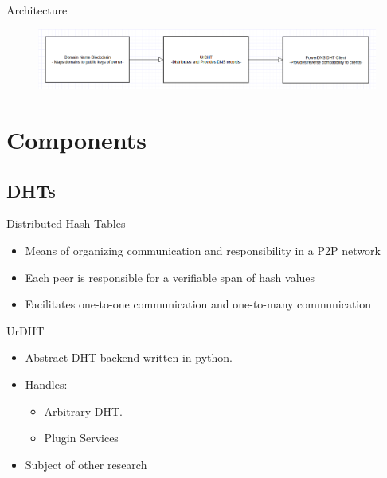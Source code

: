 \documentclass[11pt]{beamer}
\begin{document}



\begin{frame}{Architecture }
	\begin{figure}
\centering
\includegraphics[width=\linewidth]{arch}
\label{fig:arch}
\end{figure}

\end{frame}
\section{Components}

\subsection{DHTs}
\begin{frame}{Distributed Hash Tables}

	\begin{itemize}
		\item  Means of organizing communication and responsibility in a P2P network
		\item  Each peer is responsible for a verifiable span of hash values
		\item  Facilitates one-to-one communication and one-to-many communication
	\end{itemize}

\end{frame}

\begin{frame}{UrDHT}
	\begin{itemize}
		\item Abstract DHT backend written in python.
		\item Handles:
		\begin{itemize}
			\item Arbitrary DHT.
			\item Plugin Services
		\end{itemize}
		\item Subject of other research
	\end{itemize}
\end{frame}
\end{document}
